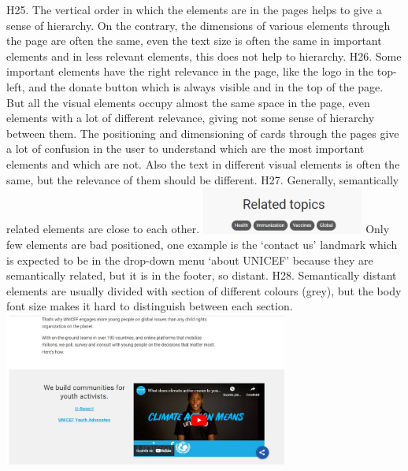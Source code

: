 \newline
\newline H25.	The vertical order in which the elements are in the pages helps to give a sense of hierarchy. On the contrary, the dimensions of various elements through the page are often the same, even the text size is often the same in important elements and in less relevant elements, this does not help to hierarchy.
\newline
\newline H26.	Some important elements have the right relevance in the page, like the logo in the top-left, and the donate button which is always visible and in the top of the page.
\newline But all the visual elements occupy almost the same space in the page, even elements with a lot of different relevance, giving not some sense of hierarchy between them.
\newline The positioning and dimensioning of cards through the pages give a lot of confusion in the user to understand which are the most important elements and which are not.
\newline Also the text in different visual elements is often the same, but the relevance of them should be different.
\newline
\newline H27.	Generally, semantically related elements are close to each other.
\newline \includegraphics[width=0.4\textwidth]{FinalScores30.jpg}
\newline Only few elements are bad positioned, one example is the ‘contact us’ landmark which is expected to be in the drop-down menu ‘about UNICEF’ because they are semantically related, but it is in the footer, so distant.
\newline
\newline H28.	Semantically distant elements are usually divided with section of different colours (grey), but the body font size makes it hard to distinguish between each section. 
\newline \includegraphics[width=0.7\textwidth]{FinalScores31.jpg}
